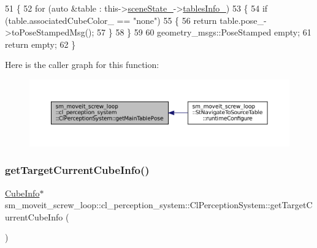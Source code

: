\begin{DoxyCode}
51             \{
52                 \textcolor{keywordflow}{for} (\textcolor{keyword}{auto} &table : this->\hyperlink{classsm__moveit__screw__loop_1_1cl__perception__system_1_1ClPerceptionSystem_abb08b3cc6d4ec414a608da92133b1f66}{sceneState\_}->\hyperlink{classsm__moveit__screw__loop_1_1cl__perception__system_1_1CpSceneState_a13c7fd5645885ad697cedb48edbb3f09}{tablesInfo\_})
53                 \{
54                     \textcolor{keywordflow}{if} (table.associatedCubeColor\_ == \textcolor{stringliteral}{"none"})
55                     \{
56                         \textcolor{keywordflow}{return} table.pose\_->toPoseStampedMsg();
57                     \}
58                 \}
59 
60                 geometry\_msgs::PoseStamped empty;
61                 \textcolor{keywordflow}{return} empty;
62             \}
\end{DoxyCode}
Here is the caller graph for this function\+:
\nopagebreak
\begin{figure}[H]
\begin{center}
\leavevmode
\includegraphics[width=350pt]{classsm__moveit__screw__loop_1_1cl__perception__system_1_1ClPerceptionSystem_a134e71d552de7d2a601927cdb2903d2b_icgraph}
\end{center}
\end{figure}
\mbox{\label{classsm__moveit__screw__loop_1_1cl__perception__system_1_1ClPerceptionSystem_ad9231b87b9592cc5c847ce1b92a75446}} 
\subsubsection{\texorpdfstring{get\+Target\+Current\+Cube\+Info()}{getTargetCurrentCubeInfo()}}
{\footnotesize\ttfamily \hyperlink{structsm__moveit__screw__loop_1_1cl__perception__system_1_1CubeInfo}{Cube\+Info}$\ast$ sm\+\_\+moveit\+\_\+screw\+\_\+loop\+::cl\+\_\+perception\+\_\+system\+::\+Cl\+Perception\+System\+::get\+Target\+Current\+Cube\+Info (\begin{DoxyParamCaption}{ }\end{DoxyParamCaption})\hspace{0.3cm}{\ttfamily [inline]}}



